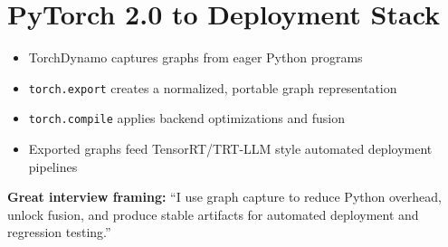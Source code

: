 \documentclass[11pt]{article}
\begin{document}
\section{PyTorch 2.0 to Deployment Stack}
\begin{itemize}[leftmargin=*]
\item TorchDynamo captures graphs from eager Python programs
\item \texttt{torch.export} creates a normalized, portable graph representation
\item \texttt{torch.compile} applies backend optimizations and fusion
\item Exported graphs feed TensorRT/TRT-LLM style automated deployment pipelines
\end{itemize}

\begin{tcolorbox}[colback=secondary]
\textbf{Great interview framing:} ``I use graph capture to reduce Python overhead, unlock fusion, and produce stable artifacts for automated deployment and regression testing.''
\end{tcolorbox}
\end{document}
